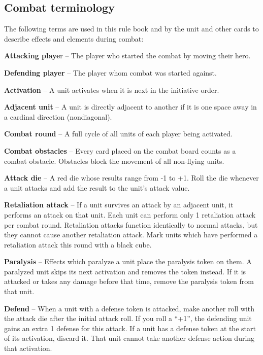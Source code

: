 \documentclass[12pt]{article}
\def\assets{assets}
\def\svgs{\assets/svgs}
\begin{document}
\subsection*{\hypertarget{Combatterminology}{Combat terminology}}
The following terms are used in this rule book and by the unit and other cards to describe effects
and elements during combat:\par
\textbf{Attacking playe}r – The player who started the combat by moving their hero.\par
\textbf{Defending player} – The player whom combat was started against.\par
\textbf{Activation} – A unit activates when it is next in the initiative order.\par
\textbf{Adjacent unit} – A unit is directly adjacent to another if it is one space away in a cardinal direction (nondiagonal).\par
\textbf{Combat round} – A full cycle of all units of each player being activated.\par
\textbf{Combat obstacles} – Every card placed on the combat board counts as a combat obstacle.
Obstacles block the movement of all non-flying units.\par
\textbf{Attack die} – A red die whose results range from -1 to +1. Roll the die whenever a unit attacks and
add the result to the unit’s attack value.\par
\textbf{\hypertarget{Retaliate}{Retaliation attack}} – If a unit survives an attack by an adjacent unit, it performs an attack on that unit. Each unit can perform only 1 retaliation attack per combat round. Retaliation attacks function
identically to normal attacks, but they cannot cause another retaliation attack. Mark units which have performed a retaliation attack this round with a black cube.\par


\textbf{Paralysis}  – Effects which paralyze a unit place the paralysis token on them. A paralyzed unit
skips its next activation and removes the token instead. If it is attacked or takes any damage before
that time, remove the paralysis token from that unit.\par
\textbf{\hypertarget{Defend}{Defend}}  – When a unit with a defense token is attacked, make another roll with the attack die
after the initial attack roll. If you roll a “+1”, the defending unit gains an extra 1 defense for this
attack. If a unit has a defense token at the start of its activation, discard it. That unit cannot take another defense action during that activation.
\end{document}
